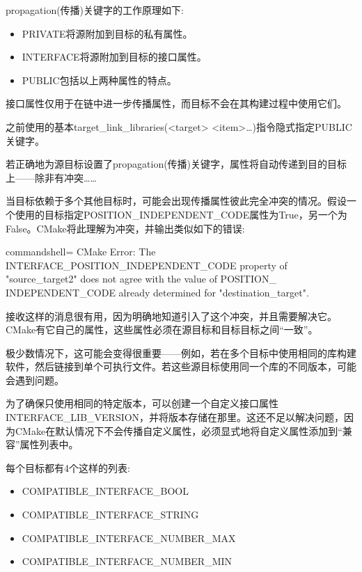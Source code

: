 propagation(传播)关键字的工作原理如下:

\begin{itemize}
\item 
PRIVATE将源附加到目标的私有属性。

\item 
INTERFACE将源附加到目标的接口属性。

\item 
PUBLIC包括以上两种属性的特点。
\end{itemize}

接口属性仅用于在链中进一步传播属性，而目标不会在其构建过程中使用它们。

之前使用的基本target\_link\_libraries(<target> <item>…)指令隐式指定PUBLIC关键字。

若正确地为源目标设置了propagation(传播)关键字，属性将自动传递到目的目标上——除非有冲突……


当目标依赖于多个其他目标时，可能会出现传播属性彼此完全冲突的情况。假设一个使用的目标指定POSITION\_INDEPENDENT\_CODE属性为True，另一个为False。CMake将此理解为冲突，并输出类似如下的错误:

\begin{tcblisting}{commandshell={}}
CMake Error: The INTERFACE_POSITION_INDEPENDENT_CODE property
of "source_target2" does not agree with the value of POSITION_
INDEPENDENT_CODE already determined for "destination_target".
\end{tcblisting}

接收这样的消息很有用，因为明确地知道引入了这个冲突，并且需要解决它。CMake有它自己的属性，这些属性必须在源目标和目标目标之间“一致”。

极少数情况下，这可能会变得很重要——例如，若在多个目标中使用相同的库构建软件，然后链接到单个可执行文件。若这些源目标使用同一个库的不同版本，可能会遇到问题。

为了确保只使用相同的特定版本，可以创建一个自定义接口属性INTERFACE\_LIB\_VERSION，并将版本存储在那里。这还不足以解决问题，因为CMake在默认情况下不会传播自定义属性，必须显式地将自定义属性添加到“兼容”属性列表中。

每个目标都有4个这样的列表:

\begin{itemize}
\item 
COMPATIBLE\_INTERFACE\_BOOL

\item 
COMPATIBLE\_INTERFACE\_STRING

\item 
COMPATIBLE\_INTERFACE\_NUMBER\_MAX

\item 
COMPATIBLE\_INTERFACE\_NUMBER\_MIN
\end{itemize}

